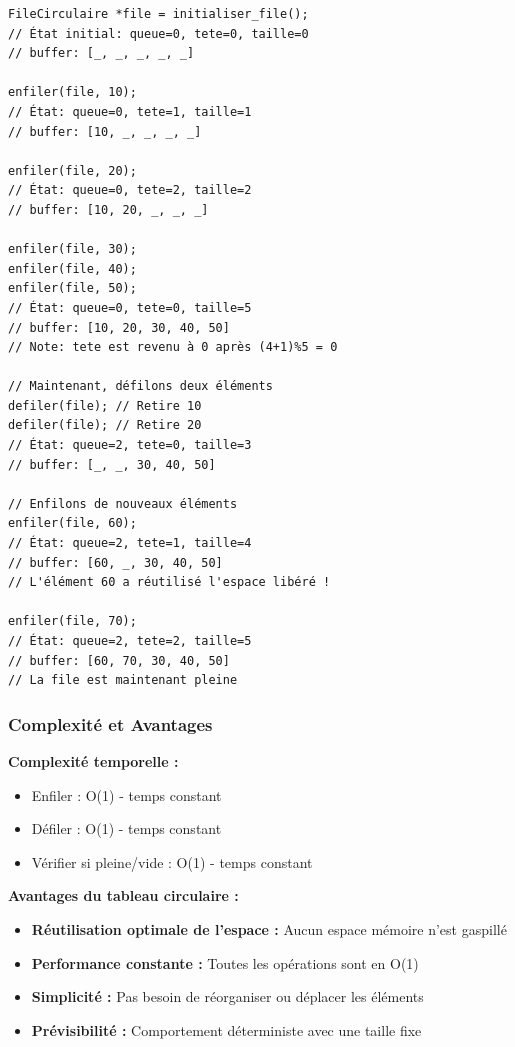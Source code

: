 \documentclass[a4paper, 11pt]{article}
\begin{document}
\begin{lstlisting}
FileCirculaire *file = initialiser_file();
// État initial: queue=0, tete=0, taille=0
// buffer: [_, _, _, _, _]

enfiler(file, 10);
// État: queue=0, tete=1, taille=1
// buffer: [10, _, _, _, _]

enfiler(file, 20);
// État: queue=0, tete=2, taille=2
// buffer: [10, 20, _, _, _]

enfiler(file, 30);
enfiler(file, 40);
enfiler(file, 50);
// État: queue=0, tete=0, taille=5
// buffer: [10, 20, 30, 40, 50]
// Note: tete est revenu à 0 après (4+1)%5 = 0

// Maintenant, défilons deux éléments
defiler(file); // Retire 10
defiler(file); // Retire 20
// État: queue=2, tete=0, taille=3
// buffer: [_, _, 30, 40, 50]

// Enfilons de nouveaux éléments
enfiler(file, 60);
// État: queue=2, tete=1, taille=4
// buffer: [60, _, 30, 40, 50]
// L'élément 60 a réutilisé l'espace libéré !

enfiler(file, 70);
// État: queue=2, tete=2, taille=5
// buffer: [60, 70, 30, 40, 50]
// La file est maintenant pleine
\end{lstlisting}

\subsubsection*{Complexité et Avantages}

\textbf{Complexité temporelle :}
\begin{itemize}
    \item Enfiler : O(1) - temps constant
    \item Défiler : O(1) - temps constant
    \item Vérifier si pleine/vide : O(1) - temps constant
\end{itemize}

\textbf{Avantages du tableau circulaire :}
\begin{itemize}
    \item \textbf{Réutilisation optimale de l'espace :} Aucun espace mémoire n'est gaspillé
    \item \textbf{Performance constante :} Toutes les opérations sont en O(1)
    \item \textbf{Simplicité :} Pas besoin de réorganiser ou déplacer les éléments
    \item \textbf{Prévisibilité :} Comportement déterministe avec une taille fixe
\end{itemize}
\end{document}
